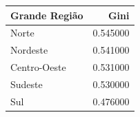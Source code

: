 \begin{tabular}{lr}
\toprule
Grande Região & Gini \\
\midrule
Norte & 0.545000 \\
Nordeste & 0.541000 \\
Centro-Oeste & 0.531000 \\
Sudeste & 0.530000 \\
Sul & 0.476000 \\
\bottomrule
\end{tabular}
